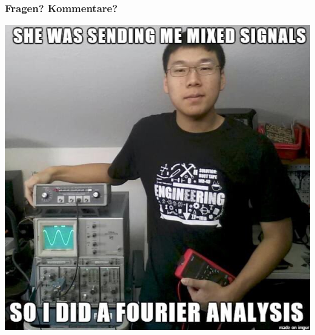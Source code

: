 \documentclass[
	11pt, %
]{beamer}
\begin{document}
\begin{frame}
		\frametitle{Fragen? Kommentare?}
	\begin{center}
	\includegraphics[scale=0.35]{ms}
	\end{center}
\end{frame}
%	
%	
\end{document}
